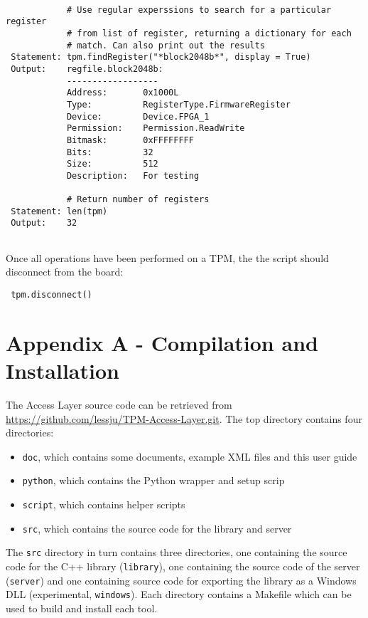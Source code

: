 \documentclass[a4paper,11pt]{article}
\begin{document}
\begin{lstlisting}
 
            # Use regular experssions to search for a particular register 
            # from list of register, returning a dictionary for each 
            # match. Can also print out the results
 Statement: tpm.findRegister("*block2048b*", display = True)
 Output:    regfile.block2048b:
            ------------------
            Address:       0x1000L
            Type:          RegisterType.FirmwareRegister
            Device:        Device.FPGA_1
            Permission:    Permission.ReadWrite
            Bitmask:       0xFFFFFFFF
            Bits:          32
            Size:          512
            Description:   For testing
            
            # Return number of registers
 Statement: len(tpm)
 Output:    32
 
\end{lstlisting}

Once all operations have been performed on a TPM, the the script should 
disconnect from the board:

\begin{lstlisting}
 tpm.disconnect()
\end{lstlisting}


\pagebreak

\section*{Appendix A - Compilation and Installation}

The Access Layer source code can be retrieved from 
\url{https://github.com/lessju/TPM-Access-Layer.git}. The top directory 
contains four directories: 
\begin{itemize}
 \item \texttt{doc}, which contains some documents, example XML files and this 
user guide
 \item \texttt{python}, which contains the Python wrapper and setup scrip
 \item \texttt{script}, which contains helper scripts
 \item \texttt{src}, which contains the source code for the library and server
\end{itemize}

The \texttt{src} directory in turn contains three directories, one containing 
the source code for the C++ library (\texttt{library}), one containing the 
source code of the server (\texttt{server}) and one containing source code for 
exporting the library as a Windows DLL (experimental, \texttt{windows}). Each 
directory contains a Makefile which can be used to build and install each tool. 
\end{document}
